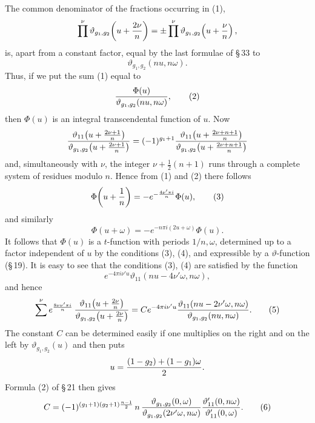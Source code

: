\documentclass[11pt]{article}
\begin{document}
The common denominator of the fractions occurring in (1),
\[
\prod^\nu \vartheta_{g_1,g_2}\!\left(u+{2\nu\over n}\right)
=\pm\prod^\nu\vartheta_{g_1,g_2}\!\left(u+{\nu\over n}\right),
\]
is, apart from a constant factor, equal by the last formulae of \S\,33 to
\[
\vartheta_{g_1,g_2}(nu,n\omega).
\]
Thus, if we put the sum (1) equal to
\begin{equation}
{\Phi(u)\over\vartheta_{g_1,g_2}(nu,n\omega)},
\tag{2}
\end{equation}
then $\Phi(u)$ is an integral transcendental function of $u$. Now
\[
{\vartheta_{11}\!\left(u+{2\nu+1\over n}\right)\over
 \vartheta_{g_1,g_2}\!\left(u+{2\nu+1\over n}\right)}
=(-1)^{g_1+1}
{\vartheta_{11}\!\left(u+{2\nu+n+1\over n}\right)\over
 \vartheta_{g_1,g_2}\!\left(u+{2\nu+n+1\over n}\right)}
\]
and, simultaneously with $\nu$, the integer $\nu+\frac12(n+1)$ runs through a complete
system of residues modulo $n$. Hence from (1) and (2) there follows
\begin{equation}
\Phi\!\left(u+{1\over n}\right)=-e^{-\frac{4\nu'\pi i}{n}}\Phi(u),
\tag{3}
\end{equation}
and similarly
\begin{equation}
\Phi(u+\omega)=-e^{-n\pi i(2u+\omega)}\Phi(u).
\tag{4}
\end{equation}
It follows that $\Phi(u)$ is a $t$-function with periods $1/n,\omega$, determined up to a
factor independent of $u$ by the conditions (3), (4), and expressible by a
$\vartheta$-function (\S\,19). It is easy to see that the conditions (3), (4) are satisfied by
the function
\[
e^{-4\pi i\nu'u}\vartheta_{11}(nu-4\nu'\omega,n\omega),
\]
and hence
\begin{equation}
\sum^\nu e^{\frac{8\nu\nu'\pi i}{n}}\,
{\vartheta_{11}\!\left(u+{2\nu\over n}\right)\over
 \vartheta_{g_1,g_2}\!\left(u+{2\nu\over n}\right)}
=
Ce^{-4\pi i\nu'u}
{\vartheta_{11}(nu-2\nu'\omega,n\omega)\over
 \vartheta_{g_1,g_2}(nu,n\omega)}.
\tag{5}
\end{equation}
The constant $C$ can be determined easily if one multiplies on the right and on the left
by $\vartheta_{g_1,g_2}(u)$ and then puts
\[
u={(1-g_2)+(1-g_1)\omega\over2}.
\]
Formula (2) of \S\,21 then gives
\begin{equation}
C=(-1)^{(g_1+1)(g_2+1)\frac{n-1}{2}}\,
n\,{\vartheta_{g_1,g_2}(0,\omega)\over\vartheta_{g_1,g_2}(2\nu'\omega,n\omega)}
{\vartheta'_{11}(0,n\omega)\over\vartheta'_{11}(0,\omega)}.
\tag{6}
\end{equation}
\end{document}
